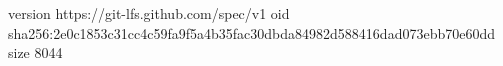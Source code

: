 version https://git-lfs.github.com/spec/v1
oid sha256:2e0c1853c31cc4c59fa9f5a4b35fac30dbda84982d588416dad073ebb70e60dd
size 8044
